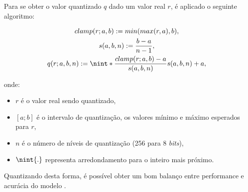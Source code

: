 Para se obter o valor quantizado $q$ dado um valor real $r$, é aplicado o seguinte algoritmo:

\begin{gather}
    clamp(r;a,b) := min(max(r,a),b), \\
    s(a,b,n) := \frac{b-a}{n-1}, \\
    q(r;a,b,n) := \nint*{\frac{clamp(r;a,b)-a}{s(a,b,n)}} s(a,b,n) + a,
\end{gather}

onde:

\begin{itemize}
    \item $r$ é o valor real sendo quantizado,
    \item $[a;b]$ é o intervalo de quantização, os valores mínimo e máximo esperados para $r$,
    \item $n$ é o número de níveis de quantização (256 para 8 \textit{bits}),
    \item $\nint{.}$ representa arredondamento para o inteiro mais próximo.
\end{itemize}

Quantizando desta forma, é possível obter um bom balanço entre performance e acurácia do modelo \cite{quantization}.